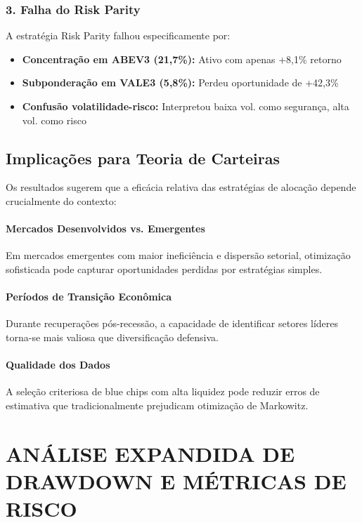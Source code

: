 \subsubsection{3. Falha do Risk Parity}
A estratégia Risk Parity falhou especificamente por:
\begin{itemize}
    \item \textbf{Concentração em ABEV3 (21,7\%):} Ativo com apenas +8,1\% retorno
    \item \textbf{Subponderação em VALE3 (5,8\%):} Perdeu oportunidade de +42,3\%
    \item \textbf{Confusão volatilidade-risco:} Interpretou baixa vol. como segurança, alta vol. como risco
\end{itemize}

\subsection{Implicações para Teoria de Carteiras}

Os resultados sugerem que a eficácia relativa das estratégias de alocação depende crucialmente do contexto:

\paragraph{Mercados Desenvolvidos vs. Emergentes}
Em mercados emergentes com maior ineficiência e dispersão setorial, otimização sofisticada pode capturar oportunidades perdidas por estratégias simples.

\paragraph{Períodos de Transição Econômica}
Durante recuperações pós-recessão, a capacidade de identificar setores líderes torna-se mais valiosa que diversificação defensiva.

\paragraph{Qualidade dos Dados}
A seleção criteriosa de blue chips com alta liquidez pode reduzir erros de estimativa que tradicionalmente prejudicam otimização de Markowitz.

\section{ANÁLISE EXPANDIDA DE DRAWDOWN E MÉTRICAS DE RISCO}

